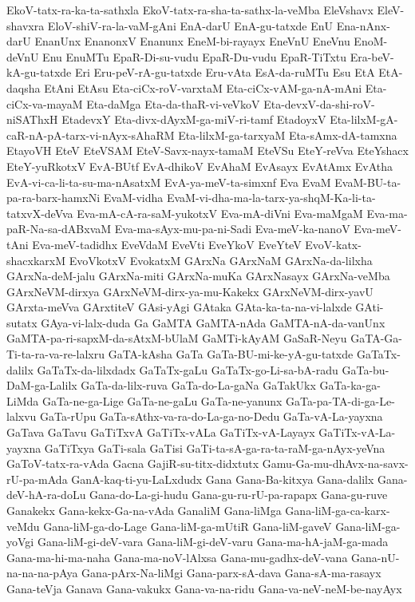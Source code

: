 {EkoV-tatx-ra-ka-ta-sathxla
EkoV-tatx-ra-sha-ta-sathx-la-veMba
EleVshavx
EleV-shavxra
EloV-shiV-ra-la-vaM-gAni
EnA-darU
EnA-gu-tatxde
EnU
Ena-nAnx-darU
EnanUnx
EnanonxV
Enanunx
EneM-bi-rayayx
EneVnU
EneVnu
EnoM-deVnU
Enu
EnuMTu
EpaR-Di-su-vudu
EpaR-Du-vudu
EpaR-TiTxtu
Era-beV-kA-gu-tatxde
Eri
Eru-peV-rA-gu-tatxde
Eru-vAta
EsA-da-ruMTu
Esu
EtA
EtA-daqsha
EtAni
EtAsu
Eta-ciCx-roV-varxtaM
Eta-ciCx-vAM-ga-nA-mAni
Eta-ciCx-va-mayaM
Eta-daMga
Eta-da-thaR-vi-veVkoV
Eta-devxV-da-shi-roV-niSAThxH
EtadevxY
Eta-divx-dAyxM-ga-miV-ri-tamf
EtadoyxV
Eta-lilxM-gA-caR-nA-pA-tarx-vi-nAyx-sAhaRM
Eta-lilxM-ga-tarxyaM
Eta-sAmx-dA-tamxna
EtayoVH
EteV
EteVSAM
EteV-Savx-nayx-tamaM
EteVSu
EteY-reVva
EteYshacx
EteY-yuRkotxV
EvA-BUtf
EvA-dhikoV
EvAhaM
EvAsayx
EvAtAmx
EvAtha
EvA-vi-ca-li-ta-su-ma-nAsatxM
EvA-ya-meV-ta-simxnf
Eva
EvaM
EvaM-BU-ta-pa-ra-barx-hamxNi
EvaM-vidha
EvaM-vi-dha-ma-la-tarx-ya-shqM-Ka-li-ta-tatxvX-deVva
Eva-mA-cA-ra-saM-yukotxV
Eva-mA-diVni
Eva-maMgaM
Eva-ma-paR-Na-sa-dABxvaM
Eva-ma-sAyx-mu-pa-ni-Sadi
Eva-meV-ka-nanoV
Eva-meV-tAni
Eva-meV-tadidhx
EveVdaM
EveVti
EveYkoV
EveYteV
EvoV-katx-shacxkarxM
EvoVkotxV
EvokatxM
GArxNa
GArxNaM
GArxNa-da-lilxha
GArxNa-deM-jalu
GArxNa-miti
GArxNa-muKa
GArxNasayx
GArxNa-veMba
GArxNeVM-dirxya
GArxNeVM-dirx-ya-mu-Kakekx
GArxNeVM-dirx-yavU
GArxta-meVva
GArxtiteV
GAsi-yAgi
GAtaka
GAta-ka-ta-na-vi-lalxde
GAti-sutatx
GAya-vi-lalx-duda
Ga
GaMTA
GaMTA-nAda
GaMTA-nA-da-vanUnx
GaMTA-pa-ri-sapxM-da-sAtxM-bUlaM
GaMTi-kAyAM
GaSaR-Neyu
GaTA-Ga-Ti-ta-ra-va-re-lalxru
GaTA-kAsha
GaTa
GaTa-BU-mi-ke-yA-gu-tatxde
GaTaTx-dalilx
GaTaTx-da-lilxdadx
GaTaTx-gaLu
GaTaTx-go-Li-sa-bA-radu
GaTa-bu-DaM-ga-Lalilx
GaTa-da-lilx-ruva
GaTa-do-La-gaNa
GaTakUkx
GaTa-ka-ga-LiMda
GaTa-ne-ga-Lige
GaTa-ne-gaLu
GaTa-ne-yanunx
GaTa-pa-TA-di-ga-Le-lalxvu
GaTa-rUpu
GaTa-sAthx-va-ra-do-La-ga-no-Dedu
GaTa-vA-La-yayxna
GaTava
GaTavu
GaTiTxvA
GaTiTx-vALa
GaTiTx-vA-Layayx
GaTiTx-vA-La-yayxna
GaTiTxya
GaTi-sala
GaTisi
GaTi-ta-sA-ga-ra-ta-raM-ga-nAyx-yeVna
GaToV-tatx-ra-vAda
Gacna
GajiR-su-titx-didxtutx
Gamu-Ga-mu-dhAvx-na-savx-rU-pa-mAda
GanA-kaq-ti-yu-LaLxdudx
Gana
Gana-Ba-kitxya
Gana-dalilx
Gana-deV-hA-ra-doLu
Gana-do-La-gi-hudu
Gana-gu-ru-rU-pa-rapapx
Gana-gu-ruve
Ganakekx
Gana-kekx-Ga-na-vAda
GanaliM
Gana-liMga
Gana-liM-ga-ca-karx-veMdu
Gana-liM-ga-do-Lage
Gana-liM-ga-mUtiR
Gana-liM-gaveV
Gana-liM-ga-yoVgi
Gana-liM-gi-deV-vara
Gana-liM-gi-deV-varu
Gana-ma-hA-jaM-ga-mada
Gana-ma-hi-ma-naha
Gana-ma-noV-lAlxsa
Gana-mu-gadhx-deV-vana
Gana-nU-na-na-na-pAya
Gana-pArx-Na-liMgi
Gana-parx-sA-dava
Gana-sA-ma-rasayx
Gana-teVja
Ganava
Gana-vakukx
Gana-va-na-ridu
Gana-va-neV-neM-be-nayAyx
}
